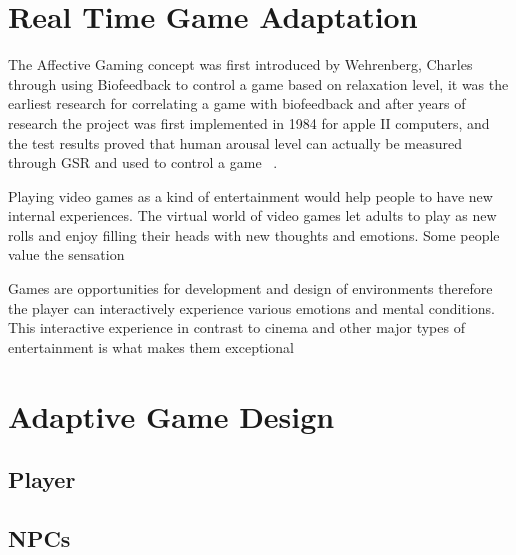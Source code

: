 \documentclass{uofsthesis-cs}
\begin{document}
\section{Real Time Game Adaptation}


The Affective Gaming concept was first introduced by Wehrenberg, Charles through using Biofeedback to control a game based on relaxation level, it was the earliest research for correlating a game with biofeedback and after years of research the project was first implemented in 1984 for apple II computers, and the test results proved that human arousal level can actually be measured through GSR and used to control a game  ~\cite{wehrenberg1995willball}.


Playing video games as a kind of entertainment would help people to have new internal
experiences. The virtual world of video games let adults to play as new rolls and enjoy filling
their heads with new thoughts and emotions. Some people value
the sensation

Games are opportunities for development and design of environments therefore
the player can interactively experience various emotions and mental conditions.
This interactive experience in contrast to cinema
and other major types of entertainment is what makes them exceptional


\section{Adaptive Game Design}
\subsection{Player}
\subsection{NPCs}
\end{document}
